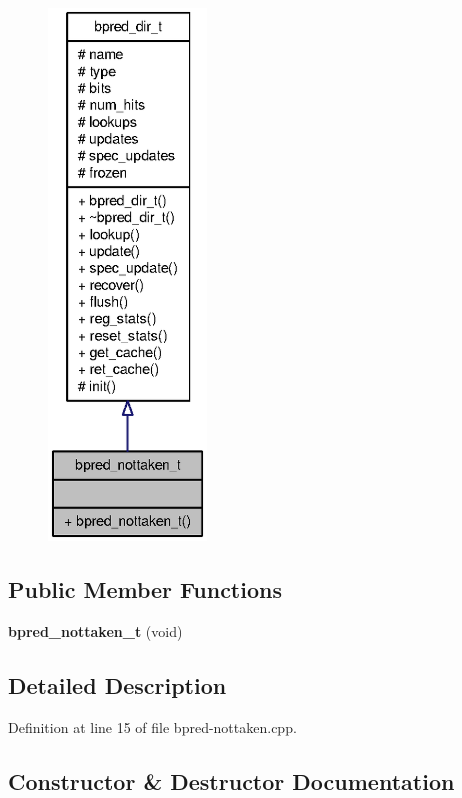 \begin{figure}[H]
\begin{center}
\leavevmode
\includegraphics[height=400pt]{classbpred__nottaken__t__coll__graph}
\end{center}
\end{figure}
\subsection*{Public Member Functions}
\begin{CompactItemize}
\item 
{\bf bpred\_\-nottaken\_\-t} (void)
\end{CompactItemize}


\subsection{Detailed Description}


Definition at line 15 of file bpred-nottaken.cpp.

\subsection{Constructor \& Destructor Documentation}
